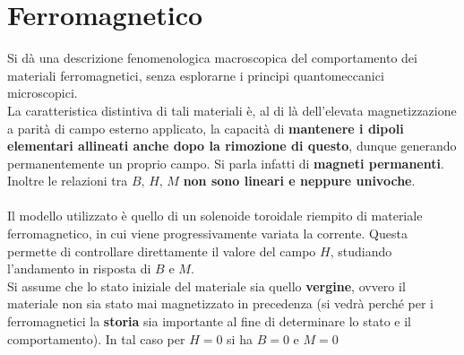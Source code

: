 \section{Ferromagnetico}
Si dà una descrizione fenomenologica macroscopica del comportamento dei materiali ferromagnetici, senza esplorarne i principi quantomeccanici microscopici.
\\La caratteristica distintiva di tali materiali è, al di là dell'elevata magnetizzazione a parità di campo esterno applicato, la capacità di \textbf{mantenere i dipoli elementari allineati anche dopo la rimozione di questo}, dunque generando permanentemente un proprio campo. Si parla infatti di \textbf{magneti permanenti}.
\\Inoltre le relazioni tra $B, \, H, \, M$ \textbf{non sono lineari e neppure univoche}.
\\~\\
Il modello utilizzato è quello di un solenoide toroidale riempito di materiale ferromagnetico, in cui viene progressivamente variata la corrente. Questa permette di controllare direttamente il valore del campo $H$, studiando l'andamento in risposta di $B$ e $M$.
\\Si assume che lo stato iniziale del materiale sia quello \textbf{vergine}, ovvero il materiale non sia stato mai magnetizzato in precedenza (si vedrà perché per i ferromagnetici la \textbf{storia} sia importante al fine di determinare lo stato e il comportamento). In tal caso per $H = 0$ si ha $B = 0$ e $M = 0$

